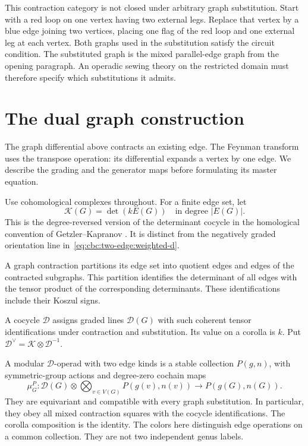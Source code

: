 This contraction category is not closed under arbitrary graph substitution.
Start with a red loop on one vertex having two external legs.
Replace that vertex by a blue edge joining two vertices, placing one flag of the red loop and one external leg at each vertex.
Both graphs used in the substitution satisfy the circuit condition.
The substituted graph is the mixed parallel-edge graph from the opening paragraph.
An operadic sewing theory on the restricted domain must therefore specify which substitutions it admits.

\section{The dual graph construction}

The graph differential above contracts an existing edge.
The Feynman transform uses the transpose operation: its differential expands a vertex by one edge.
We describe the grading and the generator maps before formulating its master equation.

Use cohomological complexes throughout.
For a finite edge set, let
\[
 \mathcal K(G)=\det(kE(G))
 \quad\text{in degree }|E(G)|.
\]
This is the degree-reversed version of the determinant cocycle in the homological convention of Getzler--Kapranov \cite[\S\S4.5--5.2]{GetzlerKapranov}.
It is distinct from the negatively graded orientation line in~\eqref{eq:cbc:two-edge:weighted-d}.

A graph contraction partitions its edge set into quotient edges and edges of the contracted subgraphs.
This partition identifies the determinant of all edges with the tensor product of the corresponding determinants.
These identifications include their Koszul signs.

A cocycle $\mathcal D$ assigns graded lines $\mathcal D(G)$ with such coherent tensor identifications under contraction and substitution.
Its value on a corolla is $k$.
Put $\mathcal D^\vee=\mathcal K\otimes\mathcal D^{-1}$.

A modular $\mathcal D$-operad with two edge kinds is a stable collection $P(g,n)$, with symmetric-group actions and degree-zero cochain maps
\[
 \mu_G^P:\mathcal D(G)\otimes
       \bigotimes_{v\in V(G)}P(g(v),n(v))
       \longrightarrow P(g(G),n(G)).
\]
They are equivariant and compatible with every graph substitution.
In particular, they obey all mixed contraction squares with the cocycle identifications.
The corolla composition is the identity.
The colors here distinguish edge operations on a common collection.
They are not two independent genus labels.

